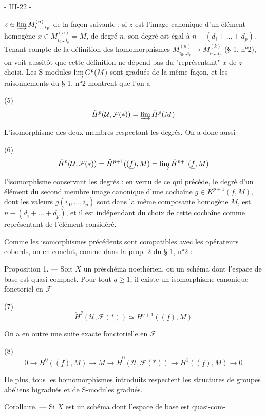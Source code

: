 \newpage


- III-22 -

$z \in \varinjlim M_{i_0 \dots i_p}^{(n)}$ de la façon suivante : si $z$ est l'image canonique
d'un élément homogène $x \in M_{i_0 \dots i_p}^{(n)} = M$, de degré $n$, son degré est égal
à $n - (d_i + \dots + d_p)$. Tenant compte de la définition des homomorphismes
$M_{i_0 \dots i_p}^{(n)} \to M_{i_0 \dots i_p}^{(k)}$ (§ 1, n°2), on voit aussitôt que cette définition ne dépend pas du "représentant" $x$ de $z$ choisi. Les S-modules $\varinjlim G^p(M)$ sont gradués de la même façon, et les raisonnements du § 1, n°2 montrent que l'on a

(5) $$ \check{H}^p(\mathcal{U}, \mathcal{F}(*)) = \varinjlim \check{H}^p(M) $$

L'isomorphisme des deux membres respectant les degrés. On a donc aussi

(6) $$ \check{H}^p(\mathcal{U}, \mathcal{F}(*)) = \check{H}^{p+1}((\underline{f}), M) = \varinjlim \check{H}^{p+1}(\underline{f}, M) $$

l'isomorphisme conservant les degrés : en vertu de ce qui précède, le degré d'un élément du second membre image canonique d'une cochaîne $g \in K^{p+1}(\underline{f}, M)$, dont les valeurs $g(i_0, \dots, i_p)$ sont dans la même composante homogène $M$, est $n - (d_i + \dots + d_p)$, et il est indépendant du choix de cette cochaîne comme représentant de l'élément considéré.

Comme les isomorphismes précédents sont compatibles avec les opérateurs cobords, on en conclut, comme dans la prop. 2 du § 1, n°2 :

Proposition 1. — Soit $X$ un préschéma noethérien, ou un schéma dont l'espace de base est quasi-compact. Pour tout $q \ge 1$, il existe un isomorphisme canonique fonctoriel en $\mathcal{F}$

(7) $$ \check{H}^q(\mathcal{U}, \mathcal{F}(*)) \simeq H^{q+1}((\underline{f}), M) $$

On a en outre une suite exacte fonctorielle en $\mathcal{F}$

(8) $$ 0 \to H^0((\underline{f}), M) \to M \to \check{H}^0(\mathcal{U}, \mathcal{F}(*)) \to H^1((\underline{f}), M) \to 0 $$

De plus, tous les homomorphismes introduits respectent les structures de groupes abéliens bigradués et de S-modules gradués.

Corollaire. — Si $X$ est un schéma dont l'espace de base est quasi-com-

